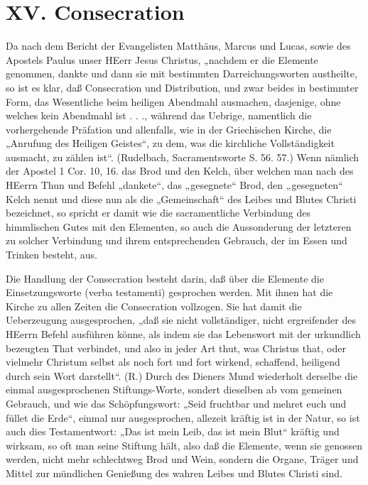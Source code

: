 \chapter{XV. Consecration}


Da nach dem Bericht der Evangelisten Matthäus, Marcus und Lucas, sowie des Apostels Paulus unser HEerr Jesus Christus, „nachdem er die Elemente genommen, dankte und dann sie mit bestimmten Darreichungsworten austheilte, so ist es klar, daß Consecration und Distribution, und zwar beides in bestimmter Form, das Wesentliche beim heiligen Abendmahl ausmachen, dasjenige, ohne welches kein Abendmahl ist . . ., während das Uebrige, namentlich die vorhergehende Präfation und allenfalls, wie in der Griechischen Kirche, die „Anrufung des Heiligen Geistes“, zu dem, was die kirchliche Vollständigkeit ausmacht, zu zählen ist“. (Rudelbach, Sacramentsworte S. 56. 57.) Wenn nämlich der Apostel 1 Cor. 10, 16. das Brod und den Kelch, über welchen man nach des HEerrn Thun und Befehl „dankete“, das „gesegnete“ Brod, den „gesegneten“ Kelch nennt und diese nun als die „Gemeinschaft“ des Leibes und Blutes Christi bezeichnet, so spricht er damit wie die sacramentliche Verbindung des himmlischen Gutes mit den Elementen, so auch die Aussonderung der letzteren zu solcher Verbindung und ihrem entsprechenden Gebrauch, der im Essen und Trinken besteht, aus.

Die Handlung der Consecration besteht darin, daß über die Elemente die Einsetzungsworte (verba testamenti) gesprochen werden. Mit ihnen hat die Kirche zu allen Zeiten die Consecration vollzogen. Sie hat damit die Ueberzeugung ausgesprochen, „daß sie nicht vollständiger, nicht ergreifender des HEerrn Befehl ausführen könne, als indem sie das Lebenswort mit der urkundlich bezeugten That verbindet, und also in jeder Art thut, was Christus that, oder vielmehr Christum selbst als noch fort und fort wirkend, schaffend, heiligend durch sein Wort darstellt“. (R.) Durch des Dieners Mund wiederholt derselbe die einmal ausgesprochenen Stiftungs-Worte, sondert dieselben ab vom gemeinen Gebrauch, und wie das Schöpfungswort: „Seid fruchtbar und mehret euch und füllet die Erde“, einmal nur ausgesprochen, allezeit kräftig ist in der Natur, so ist auch dies Testamentwort: „Das ist mein Leib, das ist mein Blut“ kräftig und wirksam, so oft man seine Stiftung hält, also daß die Elemente, wenn sie genossen werden, nicht mehr schlechtweg Brod und Wein, sondern die Organe, Träger und Mittel zur mündlichen Genießung des wahren Leibes und Blutes Christi sind.

